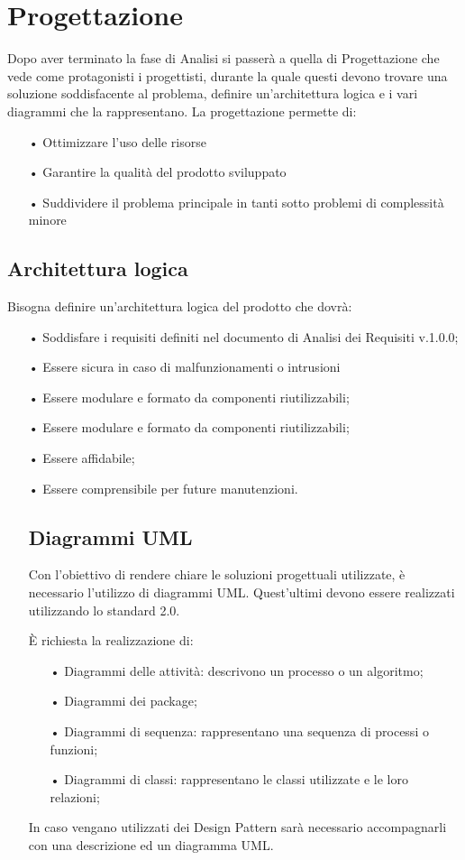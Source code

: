 \section{Progettazione}
Dopo aver terminato la fase di Analisi si passerà a quella di Progettazione che vede come protagonisti i progettisti, durante la quale questi devono trovare una soluzione soddisfacente al problema, definire un’architettura logica e i vari diagrammi che la rappresentano.
La progettazione permette di: 
\begin{itemize}
\item[•] Ottimizzare l'uso delle risorse 
\item[•] Garantire la qualità del prodotto sviluppato 
\item[•] Suddividere il problema principale in tanti sotto problemi di complessità minore 
\end{itemize}

\subsection{Architettura logica}
Bisogna definire un'architettura logica del prodotto che dovrà: 
\begin{itemize}
\item[•] Soddisfare i requisiti definiti nel documento di Analisi dei Requisiti v.1.0.0;
\item[•] Essere sicura in caso di malfunzionamenti o intrusioni \item[•] Essere modulare e formato da componenti riutilizzabili;
\item[•] Essere modulare e formato da componenti riutilizzabili;
\item[•] Essere affidabile;
\item[•] Essere comprensibile per future manutenzioni.
\noindent

\subsection{Diagrammi UML}
Con l'obiettivo di rendere chiare le soluzioni progettuali utilizzate, è necessario l'utilizzo di diagrammi UML. Quest'ultimi devono essere realizzati utilizzando lo standard 2.0.

È richiesta la realizzazione di:
\begin{itemize}
\item[•] Diagrammi delle attività: descrivono un processo o un algoritmo;
\item[•] Diagrammi dei package;
\item[•] Diagrammi di sequenza: rappresentano una sequenza di processi o funzioni;
\item[•] Diagrammi di classi: rappresentano le classi utilizzate e le loro relazioni;
\end{itemize}
In caso vengano utilizzati dei Design Pattern sarà necessario accompagnarli con una descrizione ed un diagramma UML.
\end{itemize}
